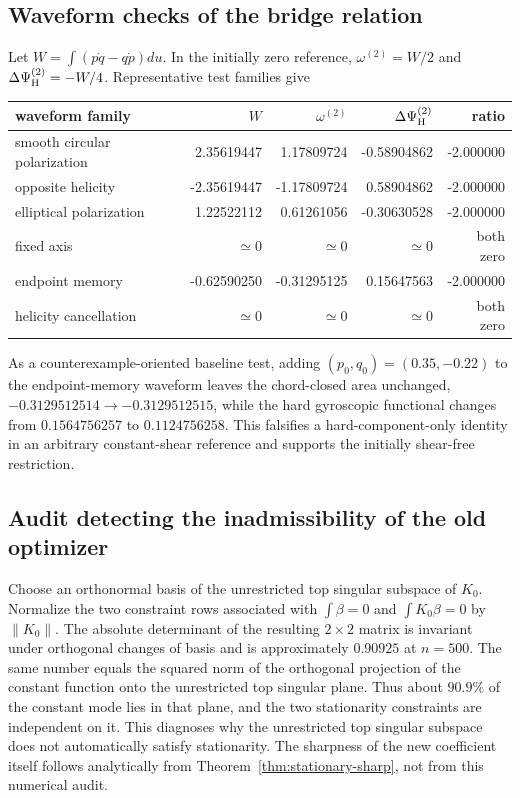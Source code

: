 \subsection{Waveform checks of the bridge relation}
Let $W=\int(p\dot q-q\dot p)du$. In the initially zero reference, $\omega^{(2)}=W/2$ and $\Delta\Psi_{\rm H}^{(2)}=-W/4$. Representative test families give
\begin{center}
\begin{tabular}{lrrrr}
\toprule
waveform family&$W$&$\omega^{(2)}$&$\Delta\Psi_{\rm H}^{(2)}$&ratio\\
\midrule
smooth circular polarization&2.35619447&1.17809724&-0.58904862&-2.000000\\
opposite helicity&-2.35619447&-1.17809724&0.58904862&-2.000000\\
elliptical polarization&1.22522112&0.61261056&-0.30630528&-2.000000\\
fixed axis&$\simeq0$&$\simeq0$&$\simeq0$&both zero\\
endpoint memory&-0.62590250&-0.31295125&0.15647563&-2.000000\\
helicity cancellation&$\simeq0$&$\simeq0$&$\simeq0$&both zero\\
\bottomrule
\end{tabular}
\end{center}
As a counterexample-oriented baseline test, adding $(p_0,q_0)=(0.35,-0.22)$ to the endpoint-memory waveform leaves the chord-closed area unchanged, $-0.3129512514\to-0.3129512515$, while the hard gyroscopic functional changes from $0.1564756257$ to $0.1124756258$. This falsifies a hard-component-only identity in an arbitrary constant-shear reference and supports the initially shear-free restriction.

\subsection{Audit detecting the inadmissibility of the old optimizer}
Choose an orthonormal basis of the unrestricted top singular subspace of $K_0$. Normalize the two constraint rows associated with $\int\beta=0$ and $\int K_0\beta=0$ by $\|K_0\|$. The absolute determinant of the resulting $2\times2$ matrix is invariant under orthogonal changes of basis and is approximately $0.90925$ at $n=500$. The same number equals the squared norm of the orthogonal projection of the constant function onto the unrestricted top singular plane. Thus about $90.9\%$ of the constant mode lies in that plane, and the two stationarity constraints are independent on it. This diagnoses why the unrestricted top singular subspace does not automatically satisfy stationarity. The sharpness of the new coefficient itself follows analytically from Theorem~\ref{thm:stationary-sharp}, not from this numerical audit.
